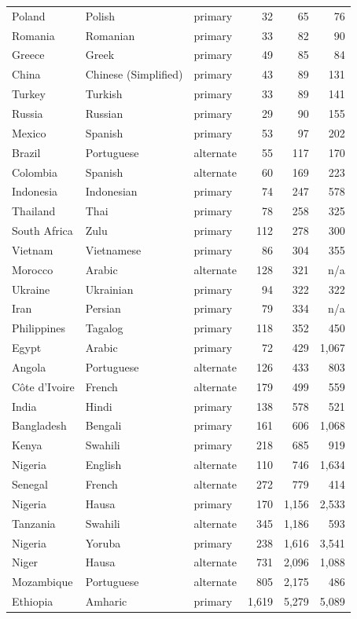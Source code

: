 \documentclass[11pt]{article}
\begin{document}
\begin{longtable}[]{@{}lllrrr@{}}
Poland & Polish & primary & 32 & 65 & 76 \\
Romania & Romanian & primary & 33 & 82 & 90 \\
Greece & Greek & primary & 49 & 85 & 84 \\
China & Chinese (Simplified) & primary & 43 & 89 & 131 \\
Turkey & Turkish & primary & 33 & 89 & 141 \\
Russia & Russian & primary & 29 & 90 & 155 \\
Mexico & Spanish & primary & 53 & 97 & 202 \\
Brazil & Portuguese & alternate & 55 & 117 & 170 \\
Colombia & Spanish & alternate & 60 & 169 & 223 \\
Indonesia & Indonesian & primary & 74 & 247 & 578 \\
Thailand & Thai & primary & 78 & 258 & 325 \\
South Africa & Zulu & primary & 112 & 278 & 300 \\
Vietnam & Vietnamese & primary & 86 & 304 & 355 \\
Morocco & Arabic & alternate & 128 & 321 & n/a \\
Ukraine & Ukrainian & primary & 94 & 322 & 322 \\
Iran & Persian & primary & 79 & 334 & n/a \\
Philippines & Tagalog & primary & 118 & 352 & 450 \\
Egypt & Arabic & primary & 72 & 429 & 1,067 \\
Angola & Portuguese & alternate & 126 & 433 & 803 \\
Côte d'Ivoire & French & alternate & 179 & 499 & 559 \\
India & Hindi & primary & 138 & 578 & 521 \\
Bangladesh & Bengali & primary & 161 & 606 & 1,068 \\
Kenya & Swahili & primary & 218 & 685 & 919 \\
Nigeria & English & alternate & 110 & 746 & 1,634 \\
Senegal & French & alternate & 272 & 779 & 414 \\
Nigeria & Hausa & primary & 170 & 1,156 & 2,533 \\
Tanzania & Swahili & alternate & 345 & 1,186 & 593 \\
Nigeria & Yoruba & primary & 238 & 1,616 & 3,541 \\
Niger & Hausa & alternate & 731 & 2,096 & 1,088 \\
Mozambique & Portuguese & alternate & 805 & 2,175 & 486 \\
Ethiopia & Amharic & primary & 1,619 & 5,279 & 5,089 \\
\end{longtable}
\end{document}
